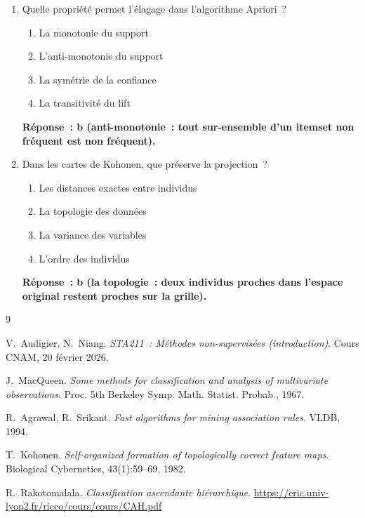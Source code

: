 \documentclass[a4paper,11pt]{article}
\theoremstyle{definition}
\theoremstyle{remark}
\begin{document}
\begin{enumerate}
  \item Quelle propri\'et\'e permet l'\'elagage dans l'algorithme
    Apriori~?
    \begin{enumerate}
      \item La monotonie du support
      \item L'anti-monotonie du support
      \item La sym\'etrie de la confiance
      \item La transitivit\'e du lift
    \end{enumerate}
    \textbf{R\'eponse~: b (anti-monotonie~: tout sur-ensemble
    d'un itemset non fr\'equent est non fr\'equent).}

  \item Dans les cartes de Kohonen, que pr\'eserve la projection~?
    \begin{enumerate}
      \item Les distances exactes entre individus
      \item La topologie des donn\'ees
      \item La variance des variables
      \item L'ordre des individus
    \end{enumerate}
    \textbf{R\'eponse~: b (la topologie~: deux individus proches
    dans l'espace original restent proches sur la grille).}

\end{enumerate}

\begin{thebibliography}{9}

  V.~Audigier, N.~Niang.
  \newblock \emph{STA211~: M\'ethodes non-supervis\'ees
    (introduction)}.
  \newblock Cours CNAM, 20 f\'evrier 2026.

  J.~MacQueen.
  \newblock \emph{Some methods for classification and analysis of
    multivariate observations}.
  \newblock Proc. 5th Berkeley Symp. Math. Statist. Probab., 1967.

  R.~Agrawal, R.~Srikant.
  \newblock \emph{Fast algorithms for mining association rules}.
  \newblock VLDB, 1994.

  T.~Kohonen.
  \newblock \emph{Self-organized formation of topologically correct
    feature maps}.
  \newblock Biological Cybernetics, 43(1):59--69, 1982.

  R.~Rakotomalala.
  \newblock \emph{Classification ascendante hi\'erarchique}.
  \newblock \url{https://eric.univ-lyon2.fr/ricco/cours/cours/CAH.pdf}

\end{thebibliography}
\end{document}
